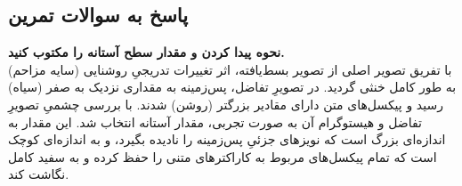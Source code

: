 \subsection{پاسخ به سوالات تمرین}
\textbf{نحوه پیدا کردن و مقدار سطح آستانه را مکتوب کنید.} \\
با تفریق تصویر اصلی از تصویر بسط‌یافته، اثر تغییرات تدریجیِ روشنایی (سایه مزاحم) به طور کامل خنثی گردید. در تصویرِ تفاضل، پس‌زمینه به مقداری نزدیک به صفر (سیاه) رسید و پیکسل‌های متن دارای مقادیر بزرگتر (روشن) شدند. با بررسی چشمیِ تصویرِ تفاضل و هیستوگرام آن به صورت تجربی، مقدار آستانه  انتخاب شد. این مقدار به اندازه‌ای بزرگ است که نویزهای جزئیِ پس‌زمینه را نادیده بگیرد، و به اندازه‌ای کوچک است که تمام پیکسل‌های مربوط به کاراکترهای متنی را حفظ کرده و به سفید کامل نگاشت کند.